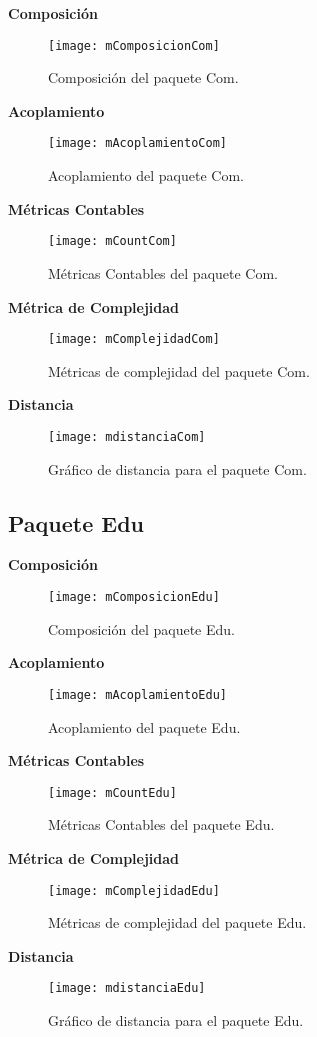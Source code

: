 \textbf{Composición}
\begin{figure}[H]
	\centering
	\texttt{[image: mComposicionCom]}
	\centering
	\caption{Composición del paquete Com.}
	\label{fig:mComposicionCom}
\end{figure}
\textbf{Acoplamiento}
\begin{figure}[H]
	\centering
	\texttt{[image: mAcoplamientoCom]}
	\centering
	\caption{Acoplamiento del paquete Com.}
	\label{fig:mAcoplamientoCom}
\end{figure}
\textbf{Métricas Contables}
\begin{figure}[H]
	\centering
	\texttt{[image: mCountCom]}
	\centering
	\caption{Métricas Contables del paquete Com.}
	\label{fig:mCountCom}
\end{figure}
\textbf{Métrica de Complejidad}
\begin{figure}[H]
	\centering
	\texttt{[image: mComplejidadCom]}
	\centering
	\caption{Métricas de complejidad del paquete Com.}
	\label{fig:mComplejidadCom}
\end{figure}
\clearpage
\textbf{Distancia}
\begin{figure}[H]
	\centering
	\texttt{[image: mdistanciaCom]}
	\centering
	\caption{Gráfico de distancia para el paquete Com.}
	\label{fig:mdistanciaCom}
\end{figure}

\newpage
\subsection{Paquete Edu}

\textbf{Composición}
\begin{figure}[H]
	\centering
	\texttt{[image: mComposicionEdu]}
	\centering
	\caption{Composición del paquete Edu.}
	\label{fig:mComposicionEdu}
\end{figure}
\textbf{Acoplamiento}
\begin{figure}[H]
	\centering
	\texttt{[image: mAcoplamientoEdu]}
	\centering
	\caption{Acoplamiento del paquete Edu.}
	\label{fig:mAcoplamientoEdu}
\end{figure}
\textbf{Métricas Contables}
\begin{figure}[H]
	\centering
	\texttt{[image: mCountEdu]}
	\centering
	\caption{Métricas Contables del paquete Edu.}
	\label{fig:mCountEdu}
\end{figure}
\textbf{Métrica de Complejidad}
\begin{figure}[H]
	\centering
	\texttt{[image: mComplejidadEdu]}
	\centering
	\caption{Métricas de complejidad del paquete Edu.}
	\label{fig:mComplejidadEdu}
\end{figure}
\clearpage
\textbf{Distancia}
\begin{figure}[H]
	\centering
	\texttt{[image: mdistanciaEdu]}
	\centering
	\caption{Gráfico de distancia para el paquete Edu.}
	\label{fig:mdistanciaEdu}
\end{figure}